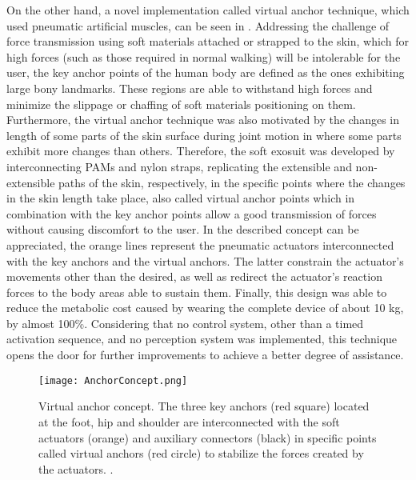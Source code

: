 On the other hand, a novel implementation called virtual anchor technique, which used pneumatic artificial muscles, can be seen in \cite{wehner2013lightweight}. Addressing the challenge of force transmission using soft materials attached or strapped to the skin, which for high forces (such as those required in normal walking) will be intolerable for the user, the key anchor points of the human body are defined as the ones exhibiting large bony landmarks. These regions are able to withstand high forces and minimize the slippage or chaffing of soft materials positioning on them. Furthermore, the virtual anchor technique was also motivated by the changes in length of some parts of the skin surface during joint motion in where some parts exhibit more changes than others. Therefore, the soft exosuit was developed by interconnecting PAMs and nylon straps, replicating the extensible and non-extensible paths of the skin, respectively, in the specific points where the changes in the skin length take place, also called virtual anchor points which in combination with the key anchor points allow a good transmission of forces without causing discomfort to the user. In  the described concept can be appreciated, the orange lines represent the pneumatic actuators interconnected with the key anchors and the virtual anchors. The latter constrain the actuator's movements other than the desired, as well as redirect the actuator's reaction forces to the body areas able to sustain them. Finally, this design was able to reduce the metabolic cost caused by wearing the complete device of about 10 kg, by almost 100\%. Considering that no control system, other than a timed activation sequence, and no perception system was implemented, this technique opens the door for further improvements to achieve a better degree of assistance.

\begin{figure}[hbtp!]
    \centering
    \texttt{[image: AnchorConcept.png]}
    \caption{Virtual anchor concept. The three key anchors (red square) located at the foot, hip and shoulder are interconnected with the soft actuators (orange) and auxiliary connectors (black) in specific points called virtual anchors (red circle) to stabilize the forces created by the actuators. \cite{wehner2013lightweight}. }
    \label{fig:anchor_concept}
\end{figure}

